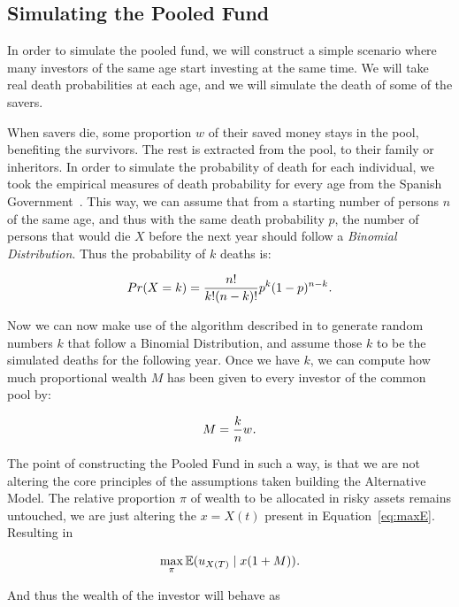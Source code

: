 \subsection{Simulating the Pooled Fund}

In order to simulate the pooled fund, we will construct a simple scenario where many investors of the same age start investing at the same time. We will take real death probabilities at each age, and we will simulate the death of some of the savers.

When savers die, some proportion $w$ of their saved money stays in the pool, benefiting the survivors. The rest is extracted from the pool, to their family or inheritors. In order to simulate the probability of death for each individual, we took the empirical measures of death probability for every age from the Spanish Government~\cite{o:mortality-table}. This way, we can assume that from a starting number of persons $n$ of the same age, and thus with the same death probability $p$, the number of persons that would die $X$ before the next year should follow a \emph{Binomial Distribution}. Thus the probability of $k$ deaths is:

\begin{align}
  Pr(X = k) = \frac{n!}{k!(n-k)!} p^k (1-p)^{n-k} \emph{.}
\end{align}

Now we can now make use of the algorithm described in \cite{a:schmeiser-binomial} to generate random numbers $k$ that follow a Binomial Distribution, and assume those $k$ to be the simulated deaths for the following year. Once we have $k$, we can compute how much proportional wealth $M$ has been given to every investor of the common pool by:

\begin{align}
  M = \frac{k}{n}w \emph{.}
\end{align}

The point of constructing the Pooled Fund in such a way, is that we are not altering the core principles of the assumptions taken building the Alternative Model. The relative proportion $\pi$ of wealth to be allocated in risky assets remains untouched, we are just altering the $x = X(t)$ present in  Equation~\ref{eq:maxE}. Resulting in

\begin{align}
	\max_{\pi}\EX\giventhat{u_{X(T)}}{x(1 + M)} \emph{.}
\end{align}

And thus the wealth of the investor will behave as

